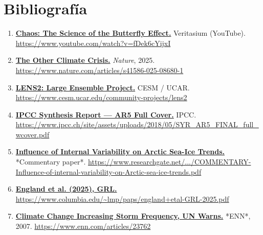 \documentclass[
  10pt,
  a4paper,
  DIV=11,
  numbers=noendperiod,
  open=any]{scrreprt}
\numberwithin{equation}{chapter}
\numberwithin{equation}{section}
\renewcommand{\[}{\begin{equation}}
\renewcommand{\]}{\end{equation}}
\begin{document}
\endgroup




\chapter*{Bibliografía}

\begin{enumerate}


  \item \label{ref:web0}\href{https://www.youtube.com/watch?v=fDek6cYijxI}{\textbf{Chaos: The Science of the Butterfly Effect.}} Veritasium (YouTube).  
  \url{https://www.youtube.com/watch?v=fDek6cYijxI}

  \item \label{ref:web1}\href{https://www.nature.com/articles/s41586-025-08680-1}{\textbf{The Other Climate Crisis.}} \textit{Nature}, 2025.  
  \url{https://www.nature.com/articles/s41586-025-08680-1}

  \item \label{ref:web2}\href{https://www.cesm.ucar.edu/community-projects/lens2}{\textbf{LENS2: Large Ensemble Project.}} CESM / UCAR.  
  \url{https://www.cesm.ucar.edu/community-projects/lens2}

  \item \label{ref:web3}\href{https://www.ipcc.ch/site/assets/uploads/2018/05/SYR_AR5_FINAL_full_wcover.pdf}{\textbf{IPCC Synthesis Report — AR5 Full Cover.}} IPCC.  
  \url{https://www.ipcc.ch/site/assets/uploads/2018/05/SYR_AR5_FINAL_full_wcover.pdf}

  \item \label{ref:web4}\href{https://www.researchgate.net/profile/Jennifer-Kay-7/publication/276333917_COMMENTARY_Influence_of_internal_variability_on_Arctic_sea-ice_trends/links/5d6738cc299bf11adf298934/COMMENTARY-Influence-of-internal-variability-on-Arctic-sea-ice-trends.pdf}{\textbf{Influence of Internal Variability on Arctic Sea-Ice Trends.}} *Commentary paper*.  
  \url{https://www.researchgate.net/.../COMMENTARY-Influence-of-internal-variability-on-Arctic-sea-ice-trends.pdf}

  \item \label{ref:web5}\href{https://www.columbia.edu/\string~lmp/paps/england\%2Betal-GRL-2025.pdf}{\textbf{England et al. (2025), GRL.}}  
  \url{https://www.columbia.edu/~lmp/paps/england+etal-GRL-2025.pdf}

  \item \label{ref:web6}\href{https://www.enn.com/articles/23762}{\textbf{Climate Change Increasing Storm Frequency, UN Warns.}} *ENN*, 2007.  
  \url{https://www.enn.com/articles/23762}


\end{enumerate}
\end{document}
